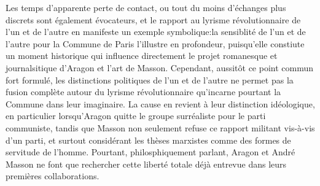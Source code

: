 Les temps d'apparente perte de contact, ou tout du moins d'échanges plus discrets sont également évocateurs, et le rapport au lyrisme révolutionnaire de l'un et de l'autre en manifeste un exemple symbolique:la sensiblité de l'un et de l'autre pour la Commune de Paris l'illustre en profondeur, puisqu'elle constiute un moment historique qui influence directement le projet romanesque et journalsitique d'Aragon et l'art de Masson. Cependant, aussitôt ce point commun fort formulé, les distinctions politiques de l'un et de l'autre ne permet pas la fusion complète autour du lyrisme révolutionnaire qu'incarne pourtant la Commune dans leur imaginaire. La cause en revient à leur distinction idéologique, en particulier lorsqu'Aragon quitte le groupe surréaliste pour le parti communiste, tandis que Masson non seulement refuse ce rapport militant vis-à-vis d'un parti, et surtout considérant les thèses marxistes comme des formes de servitude de l'homme. Pourtant, philosphiquement parlant, Aragon et André Masson ne font que rechercher cette liberté totale déjà entrevue dans leurs premières collaborations. 